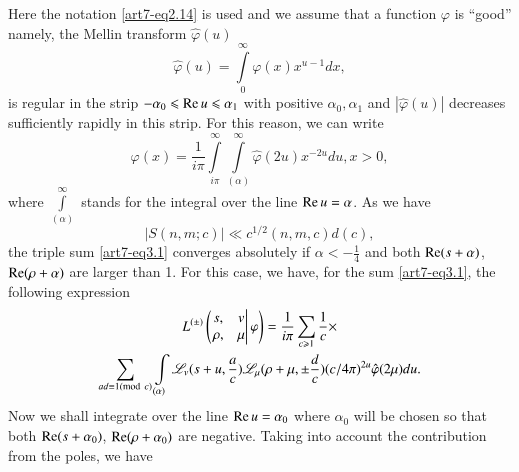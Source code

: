 Here the notation \eqref{art7-eq2.14} is used and we assume that a function $\varphi$ is ``good'' namely, the Mellin transform $\hat{\varphi} (u)$
\begin{equation}
\hat{\varphi} (u) = \int\limits^\infty_0 \varphi (x) x^{u-1} d x, \label{art7-eq3.2}
\end{equation}
is regular in the strip $-\alpha_0 \leqslant \operatorname{Re} u \leqslant \alpha_1$ with positive $\alpha_0, \alpha_1$ and $|\hat{\varphi} (u)|$ decreases sufficiently rapidly in this strip. For this reason, we can write 
\begin{equation}
\varphi (x) = \frac{1}{i\pi} \int\limits^\infty_{i\pi} \int\limits^\infty_{(\alpha)} \hat{\varphi} (2u) x^{-2u} du, x >0, \label{art7-eq3.3}
\end{equation}
where $\int\limits^\infty_{(\alpha)}$ stands for the integral over the line $\operatorname{Re} u = \alpha$. As we have 
$$
|S(n,m;c)| \ll c^{1/2} (n,m,c) d (c),
$$
the triple sum \eqref{art7-eq3.1} converges absolutely if $\alpha < - \frac{1}{4}$ and both $\operatorname{Re} (s+\alpha)$, $\operatorname{Re} (\rho + \alpha)$ are larger than 1. For this case, we have, for the sum \eqref{art7-eq3.1}, the following expression
\begin{gather}
L^{(\pm)}
\left( 
\left. 
\begin{matrix}
s, & v \\
\rho, & \mu 
\end{matrix}
\right| \varphi 
\right)=
\frac{1}{i\pi} \sum\limits_{c \geqslant 1} \frac{1}{c} \times \label{art7-eq3.4} \\
\sum\limits_{ad \equiv 1 ({\rm{mod}}\kern.3em c)} \int\limits_{(\alpha)} \mathscr{L}_v (s+ u, \frac{a}{c}) \mathscr{L}_\mu (\rho + \mu, \pm \frac{d}{c}) (c/4\pi)^{2u} \hat{\varphi} (2\mu) du. \notag
\end{gather}
Now we shall integrate over the line $\operatorname{Re} u = \alpha_0$ where $\alpha_0$ will be chosen so that both $\operatorname{Re} (s+\alpha_0)$, $\operatorname{Re}(\rho+ \alpha_0)$ are negative. Taking into account the contribution from the poles, we have 
